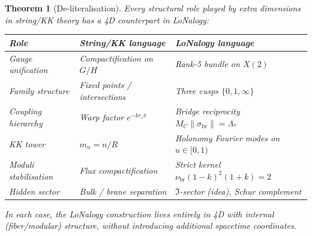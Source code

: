 \documentclass[12pt]{article}
\theoremstyle{plain}
\newtheorem{theorem}{Theorem}[section]
\theoremstyle{definition}
\numberwithin{equation}{section}
\newcommand{\br}{\mathrm{br}}
\newcommand{\fI}{\mathfrak{I}}
\begin{document}
\begin{theorem}[De-literalisation]\label{thm:delit}
Every structural role played by extra dimensions in string/KK theory
has a 4D counterpart in LoNalogy:

\begin{center}
\begin{tabular}{lll}
\toprule
Role & String/KK language & LoNalogy language\\
\midrule
Gauge unification
  & Compactification on $G/H$
  & Rank-5 bundle on $X(2)$\\
Family structure
  & Fixed points / intersections
  & Three cusps $\{0,1,\infty\}$\\
Coupling hierarchy
  & Warp factor $e^{-k r_c\pi}$
  & Bridge reciprocity $M_C\|\sigma_{\br}\|=\Lambda_*$\\
KK tower
  & $m_n = n/R$
  & Holonomy Fourier modes on $u\in[0,1)$\\
Moduli stabilisation
  & Flux compactification
  & Strict kernel $\nu_{\br}(1-k)^2(1+k)=2$\\
Hidden sector
  & Bulk / brane separation
  & $\fI$-sector (idea), Schur complement\\
\bottomrule
\end{tabular}
\end{center}

In each case, the LoNalogy construction lives entirely in 4D with
internal (fiber/modular) structure, without introducing additional
spacetime coordinates.
\end{theorem}
\end{document}
